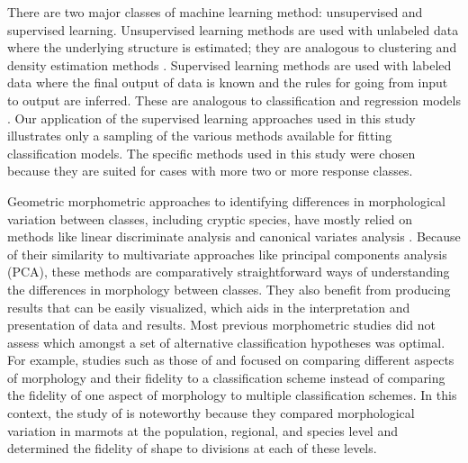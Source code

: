 \documentclass[11pt]{article}
\begin{document}
There are two major classes of machine learning method: unsupervised and supervised learning. Unsupervised learning methods are used with unlabeled data where the underlying structure is estimated; they are analogous to clustering and density estimation methods \citep{Kaufman1990}. Supervised learning methods are used with labeled data where the final output of data is known and the rules for going from input to output are inferred. These are analogous to classification and regression models \citep{Breiman1984,Hastie2009}. Our application of the supervised learning approaches used in this study illustrates only a sampling of the various methods available for fitting classification models. The specific methods used in this study were chosen because they are suited for cases with more two or more response classes.

Geometric morphometric approaches to identifying differences in morphological variation between classes, including cryptic species, have mostly relied on methods like linear discriminate analysis and canonical variates analysis \citep{Polly2003,Zelditch2004,Gaubert2005b,Gunduz2007,Polly2007a,Francoy2009,Sztencel-Jabonka2009,Edwards2011,MitrovskiBogdanovic2013,Dillard2017}. Because of their similarity to multivariate approaches like principal components analysis (PCA), these methods are comparatively straightforward ways of understanding the differences in morphology between classes. They also benefit from producing results that can be easily visualized, which aids in the interpretation and presentation of data and results. Most previous morphometric studies did not assess which amongst a set of alternative classification hypotheses was optimal. For example, studies such as those of \citet{Caumul2005a} and \citet{Polly2007a} focused on comparing different aspects of morphology and their fidelity to a classification scheme instead of comparing the fidelity of one aspect of morphology to multiple classification schemes. In this context, the study of \citet{Cardini2009a} is noteworthy because they compared morphological variation in marmots at the population, regional, and species level and determined the fidelity of shape to divisions at each of these levels.
\end{document}
